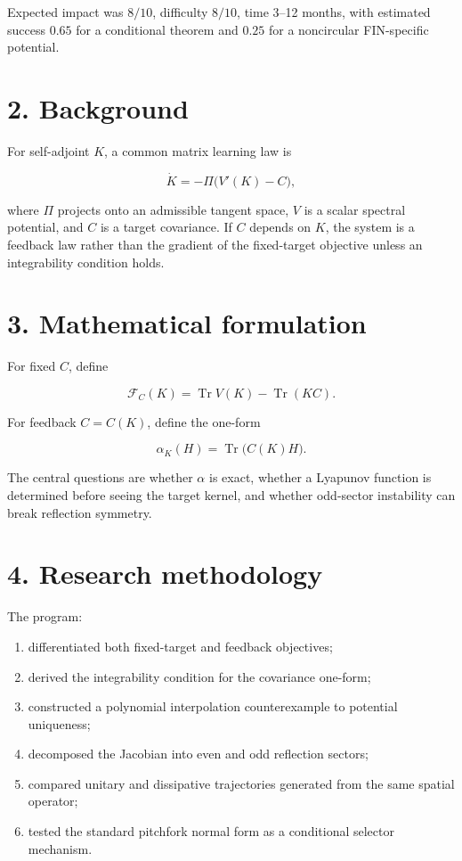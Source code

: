 \documentclass[11pt,a4paper,openany]{report}
\begin{document}
Expected impact was \(8/10\), difficulty \(8/10\), time 3–12 months, with estimated success \(0.65\) for a conditional theorem and \(0.25\) for a noncircular FIN-specific potential.

\section{2. Background}

For self-adjoint \(K\), a common matrix learning law is

\[
\dot K=-\Pi\bigl(V'(K)-C\bigr),
\]

where \(\Pi\) projects onto an admissible tangent space, \(V\) is a scalar spectral potential, and \(C\) is a target covariance. If \(C\) depends on \(K\), the system is a feedback law rather than the gradient of the fixed-target objective unless an integrability condition holds.

\section{3. Mathematical formulation}

For fixed \(C\), define

\[
\mathcal F_C(K)=\operatorname{Tr}V(K)-\operatorname{Tr}(KC).
\]

For feedback \(C=C(K)\), define the one-form

\[
\alpha_K(H)=\operatorname{Tr}\!\bigl(C(K)H\bigr).
\]

The central questions are whether \(\alpha\) is exact, whether a Lyapunov function is determined before seeing the target kernel, and whether odd-sector instability can break reflection symmetry.

\section{4. Research methodology}

The program:

\begin{enumerate}
\item 
differentiated both fixed-target and feedback objectives;

\item 
derived the integrability condition for the covariance one-form;

\item 
constructed a polynomial interpolation counterexample to potential uniqueness;

\item 
decomposed the Jacobian into even and odd reflection sectors;

\item 
compared unitary and dissipative trajectories generated from the same spatial operator;

\item 
tested the standard pitchfork normal form as a conditional selector mechanism.

\end{enumerate}
\end{document}
